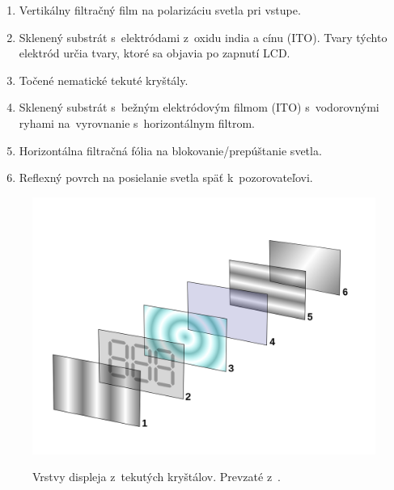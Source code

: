 \begin{enumerate}
    \item Vertikálny filtračný film na polarizáciu svetla pri vstupe.
    \item Sklenený substrát s~elektródami z~oxidu india a cínu (ITO). Tvary týchto elektród určia tvary, ktoré sa objavia po zapnutí LCD.
    \item Točené nematické tekuté kryštály.
    \item Sklenený substrát s~bežným elektródovým filmom (ITO) s~vodorovnými ryhami na~vyrovnanie s~horizontálnym filtrom.
    \item Horizontálna filtračná fólia na blokovanie/prepúštanie svetla.
    \item Reflexný povrch na posielanie svetla späť k~pozorovateľovi. 
\end{enumerate}

\begin{figure}[ht]
\centering
\includegraphics[scale=0.23]{obrazky-figures/LCDdisplay.png}
\caption{Vrstvy displeja z~tekutých kryštálov. Prevzaté z~\cite{fotoLCD}.}{\label{lcdHUD}}
\end{figure}

